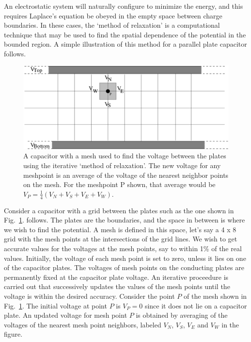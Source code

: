 \documentclass[12pt]{article}
\begin{document}
\begin{flushleft}
\afterpage{\clearpage}

An electrostatic system will naturally configure to minimize the energy, and this requires Laplace's equation be obeyed in the empty space between charge boundaries.  In these cases, the `method of relaxation' is a computational technique that may be used to find the spatial dependence of the potential in the bounded region.  A simple illustration of this method for a parallel plate capacitor follows.

\begin{figure}[h]
\centering
\includegraphics*[trim=0cm 0cm 0cm 0cm, clip=true, width=0.7\columnwidth]{capmesh.pdf}
\caption{\small A capacitor with a mesh used to find the voltage between the plates using the iterative `method of relaxation'.  The new voltage for any meshpoint is an average of the voltage of the nearest neighbor points on the mesh.  For the meshpoint P shown, that average would be $V_{P}=\frac{1}{4}\left( V_{N}+V_{S}+V_{E}+V_{W} \right)$.}
\label{fig:capmesh}
\end{figure}

Consider a capacitor with a grid between the plates such as the one shown in Fig.~\ref{fig:capmesh}. follows.    The plates are the boundaries, and the space in between is where we wish to find the potential.  A mesh is defined in this space, let's say a 4 x 8 grid with the mesh points at the intersections of the grid lines.  We wish to get accurate values for the voltages at the mesh points, say to within 1\% of the real values.  Initially, the voltage of each mesh point is set to zero, unless it lies on one of the capacitor plates.  The voltages of mesh points on the conducting plates are permanently fixed at the capacitor plate voltage.  An iterative proceedure is carried out that successively updates the values of the mesh points until the voltage is within the desired accuracy.  Consider the point $P$ of the mesh shown in Fig.~\ref{fig:capmesh}.  The initial voltage at point $P$ is $V_{P}=0$ since it does not lie on a capacitor plate.  An updated voltage for mesh point $P$ is obtained by averaging of the voltages of the nearest mesh point neighbors, labeled $V_{N}$, $V_{S}$,  $V_{E}$ and  $V_{W}$ in the figure.  


\end{flushleft}
\end{document}

